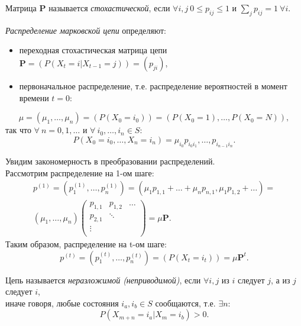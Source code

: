 \documentclass[14pt,a4paper]{article}
\begin{document}
Матрица $\mathbf{P}$  называется \textit{стохастической}, если $\forall i, j \ 0 \leqslant p_{ij} \leqslant1$ и $\sum_j p_{i j} = 1 \ \forall i.$

\textit{Распределение марковской цепи} определяют:
\begin{itemize}
\item переходная стохастическая матрица цепи $\mathbf{P} = \left(P(X_t = i | X_{t-1} = j)\right) =\left(p_{j i}\right)$,
\item первоначальное распределение, т.е. распределение вероятностей в момент времени $t = 0$:  
\end{itemize}	
\begin{equation}
   \mu = (\mu_1, \dots, \mu_n) = (P(X_0 = i_0))= \left(P\left(X_0 = 1\right),\dots,P\left(X_0 = N\right)\right), 
\end{equation}
так что $\forall \ n = 0, 1,\dots$ и $\forall \ i_0, \dots, i_n \in S$:
\begin{equation}
    P(X_0 = i_0, \dots, X_n = i_n) = \mu_{i_0}p_{i_0 i_1},\dots,p_{i_{n-1} i_n}.
\end{equation}


Увидим закономерность в преобразовании распределений.\\Рассмотрим распределение на 1-ом шаге:
\begin{equation}
\begin{gathered}
    p^{(1)} = (p^{(1)}_1,\dots,p^{(1)}_n) = (\mu_1p_{1,1}+\dots+\mu_n p_{n,1}, \mu_1p_{1,2}+\dots) = \\(\mu_1, \dots, \mu_n)
  \begin{pmatrix}
    p_{1,1} & p_{1,2} & \dots \\
    p_{2,1} & \ddots \\
    \vdots &  \\
  \end{pmatrix} = \mu \mathbf{P}.
\end{gathered}
\end{equation}
Таким образом, распределение на t-ом шаге:
\begin{equation}
    p^{(t)} = (p^{(t)}_1,\dots,p^{(t)}_n) = (P(X_t = i_t))  = \mu \mathbf{P}^t.
\end{equation}

\[\]
Цепь называется \textit{неразложимой (неприводимой)}, если $\forall i, j$ из $i$ следует $j$, а из $j$ следует $i$,\\
иначе говоря, любые состояния $i_a, i_b \in S$ сообщаются, т.е. $\exists n:$
\begin{equation}
    P(X_{m+n} = i_a|X_m = i_b) > 0.
\end{equation}
\end{document}
